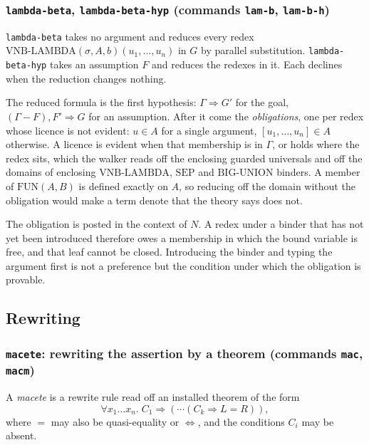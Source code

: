 \subsubsection*{\texttt{lambda-beta}, \texttt{lambda-beta-hyp}
  (commands \texttt{lam-b}, \texttt{lam-b-h})}

\texttt{lambda-beta} takes no argument and reduces every redex
$\mathrm{VNB\text{-}LAMBDA}(\sigma, A, b)(u_1, \ldots, u_n)$ in $G$ by
parallel substitution.  \texttt{lambda-beta-hyp} takes an assumption $F$
and reduces the redexes in it.  Each declines when the reduction changes
nothing.

The reduced formula is the first hypothesis: $\Gamma \Longrightarrow G'$
for the goal, $(\Gamma - F), F' \Longrightarrow G$ for an assumption.
After it come the \emph{obligations}, one per redex whose licence is not
evident: $u \in A$ for a single argument,
$[u_1, \ldots, u_n] \in A$ otherwise.  A licence is evident when that
membership is in $\Gamma$, or holds where the redex sits, which the
walker reads off the enclosing guarded universals and off the domains of
enclosing $\mathrm{VNB\text{-}LAMBDA}$, $\mathrm{SEP}$ and
$\mathrm{BIG\text{-}UNION}$ binders.  A member of
$\mathrm{FUN}(A, B)$ is defined exactly on $A$, so reducing off the
domain without the obligation would make a term denote that the theory
says does not.

\begin{remark}
The obligation is posted in the context of $N$.  A redex under a binder
that has not yet been introduced therefore owes a membership in which the
bound variable is free, and that leaf cannot be closed.  Introducing the
binder and typing the argument first is not a preference but the
condition under which the obligation is provable.
\end{remark}

\subsection{Rewriting}

\subsubsection*{\texttt{macete}: rewriting the assertion by a theorem
  (commands \texttt{mac}, \texttt{macm})}

A \emph{macete} is a rewrite rule read off an installed theorem of the
form
\[
  \forall x_1 \ldots x_n.\; C_1 \Rightarrow (\cdots (C_k \Rightarrow L = R)),
\]
where $=$ may also be quasi-equality or $\Leftrightarrow$, and the
conditions $C_i$ may be absent.


